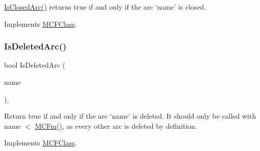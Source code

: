 \mbox{\hyperlink{class_m_c_f_simplex_a95d97fdf20e0075a8deda52f4925072a}{Is\+Closed\+Arc()}} returns true if and only if the arc `name' is closed. 

Implements \mbox{\hyperlink{class_m_c_f_class_a2db08ae33bcdb997677a69f36c60c1e5}{M\+C\+F\+Class}}.

\mbox{\label{class_m_c_f_simplex_a303cdd3554fa6aa53098d080262d1e4b}} 
\subsubsection{\texorpdfstring{Is\+Deleted\+Arc()}{IsDeletedArc()}}
{\footnotesize\ttfamily bool Is\+Deleted\+Arc (\begin{DoxyParamCaption}\item[{\mbox{\hyperlink{class_m_c_f_class_a76aaabb20535c51a2752b93f6c38fe54}{c\+Index}}}]{name }\end{DoxyParamCaption})\hspace{0.3cm}{\ttfamily [override]}, {\ttfamily [virtual]}}

Return true if and only if the arc `name' is deleted. It should only be called with name $<$ \mbox{\hyperlink{class_m_c_f_class_ab4d5a0d0fc49882de0b4eb3146f1b7a6}{M\+C\+Fm()}}, as every other arc is deleted by definition. 

Implements \mbox{\hyperlink{class_m_c_f_class_a5f72b1b728182519a6a11accdfa78c7d}{M\+C\+F\+Class}}.

\mbox{\label{class_m_c_f_simplex_ac270d18d58fd6fe88164cde1f4c80aff}} 
